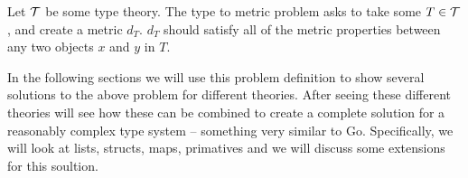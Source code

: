 \begin{definition}
    Let $\mathcal{T}$ be some type theory.
    The type to metric problem asks to take some $T \in \mathcal{T}$,
    and create a metric $d_{T}$.
    $d_{T}$ should satisfy all of the metric properties between any two objects $x$ and $y$ in $T$.
\end{definition}

In the following sections we will use this problem definition to show several solutions to the above problem for different theories.
After seeing these different theories will see how these can be combined to create a complete solution for a reasonably complex type system --
something very similar to Go. 
Specifically, we will look at lists, structs, maps, primatives and we will discuss some extensions for this soultion.